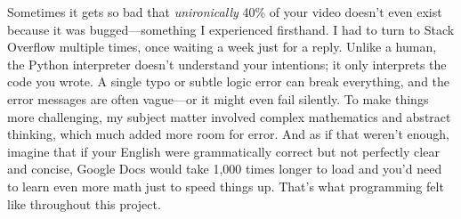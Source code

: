 \documentclass{article}
\begin{document}
Sometimes it gets so bad that \textit{unironically} 40\% of your video doesn’t even exist because it was bugged—something I experienced firsthand.
I had to turn to Stack Overflow multiple times, once waiting a week just for a reply.
Unlike a human, the Python interpreter doesn’t understand your intentions; it only interprets the code you wrote.
A single typo or subtle logic error can break everything, and the error messages are often vague—or it might even fail silently.
To make things more challenging, my subject matter involved complex mathematics and abstract thinking, which much added more room for error.
And as if that weren’t enough, imagine that if your English were grammatically correct but not perfectly clear and concise, Google Docs would take 1,000 times longer to load
and you’d need to learn even more math just to speed things up.
That’s what programming felt like throughout this project.
\end{document}
